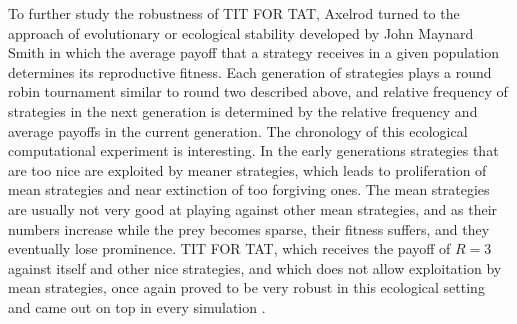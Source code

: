 To further study the robustness of TIT FOR TAT, Axelrod turned to the approach of evolutionary or ecological stability developed by John Maynard Smith in which the average payoff that a strategy receives in a given population determines its reproductive fitness. Each generation of strategies plays a round robin tournament similar to round two described above, and relative frequency of strategies in the next generation is determined by the relative frequency and average payoffs in the current generation. The chronology of this ecological computational experiment is interesting. In the early generations strategies that are too nice are exploited by meaner strategies, which leads to proliferation of mean strategies and near extinction of too forgiving ones. The mean strategies are usually not very good at playing against other mean strategies, and as their numbers increase while the prey becomes sparse, their fitness suffers, and they eventually lose prominence. TIT FOR TAT, which receives the payoff of $R = 3$ against itself and other nice strategies, and which does not allow exploitation by mean strategies, once again proved to be very robust in this ecological setting and came out on top in every simulation \cite[p.53]{axelrod1984evolution}.

